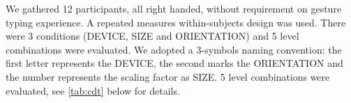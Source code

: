\documentclass{chi-ext}
\newcommand{\cdt}[1]{{\small\uppercase{{#1}}}}
\begin{document}
We gathered 12 participants, all right handed, without requirement on gesture typing experience.
A repeated measures within-subjects design was used. There were 3 conditions (\cdt{device}, \cdt{size} and \cdt{orientation}) and 5 level combinations were evaluated. We adopted a 3-symbols naming convention: the first letter represents the DEVICE, the second marks the ORIENTATION and the number represents the scaling factor as SIZE. 5 level combinations were evaluated, see \autoref{tab:cdt} below for details.


\end{document}

